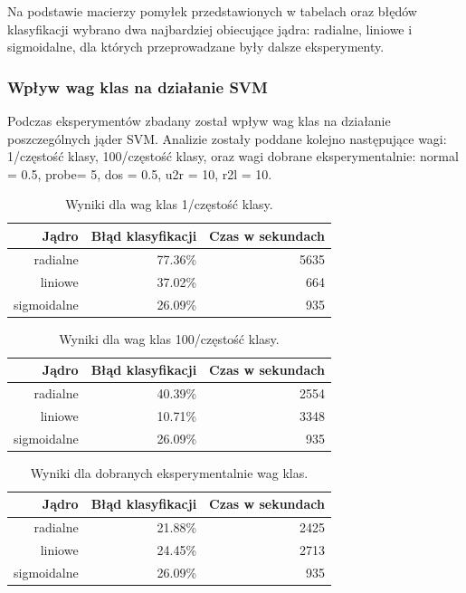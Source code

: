 \documentclass[a4paper, 12pt]{article}
\begin{document}
Na podstawie macierzy pomyłek przedstawionych w tabelach oraz błędów klasyfikacji wybrano dwa najbardziej obiecujące jądra: radialne, liniowe i sigmoidalne, dla których przeprowadzane były dalsze eksperymenty.

\subsubsection{Wpływ wag klas na działanie SVM}
Podczas eksperymentów zbadany został wpływ wag klas na działanie poszczególnych jąder SVM. Analizie zostały poddane kolejno następujące wagi: 1/częstość klasy, 100/częstość klasy, oraz wagi dobrane eksperymentalnie: normal = 0.5, probe= 5, dos = 0.5, u2r = 10, r2l = 10.

\begin{table}[H]
\centering
\begin{tabular}{ | r | r | r | } \hline
Jądro & Błąd klasyfikacji & Czas w sekundach \\ \hline
radialne & 77.36\% & 5635 \\ \hline
liniowe & 37.02\% & 664 \\ \hline
sigmoidalne & 26.09\% & 935 \\ \hline
\end{tabular} 
\caption{Wyniki dla wag klas 1/częstość klasy.}
\end{table}

\begin{table}[H]
\centering
\begin{tabular}{ | r | r | r | } \hline
Jądro & Błąd klasyfikacji & Czas w sekundach \\ \hline
radialne & 40.39\% & 2554 \\ \hline
liniowe & 10.71\% & 3348 \\ \hline
sigmoidalne & 26.09\% & 935 \\ \hline
\end{tabular} 
\caption{Wyniki dla wag klas 100/częstość klasy.}
\end{table}

\begin{table}[H]
\centering
\begin{tabular}{ | r | r | r | } \hline
Jądro & Błąd klasyfikacji & Czas w sekundach \\ \hline
radialne & 21.88\% & 2425 \\ \hline
liniowe & 24.45\% & 2713 \\ \hline
sigmoidalne & 26.09\% & 935 \\ \hline
\end{tabular} 
\caption{Wyniki dla dobranych eksperymentalnie wag klas.}
\end{table}
\end{document}
